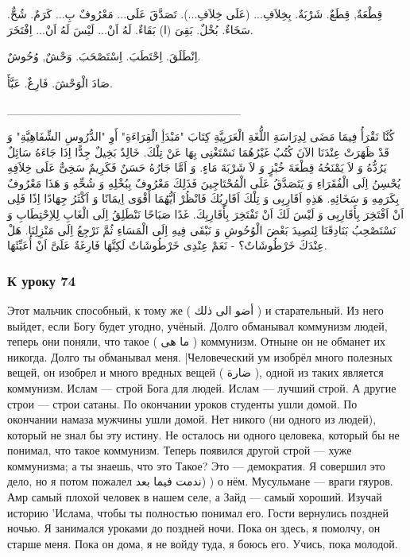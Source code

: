 \documentclass[a5paper]{article}
\begin{document}
قِطْعَةٌ, قِطَعٌ. شَرْبَةٌ. بِخِلاَفِ... (عَلَى خِلاَفِ...). تَصَدَّقَ عَلَى... مَعْرُوفٌ بِ... كَرَمٌ. شُحٌّ. سَخَاءٌ. بُخْلٌ. بَقِىَ (ا) بَقَاءٌ. لَهُ اَنْ... لَيْسَ لَهُ اَنْ... اِفْتَخَرَ.

اِنْطَلَقَ. اِحْتَطَبَ. اِسْتَصْحَبَ. وَحْشٌ, وُحُوشٌ. 

صَادَ الْوَحْشَ. فَارِغٌ. عَبَّأَ.

\_\_\_\_\_\_\_\_\_\_\_\_\_\_\_\_\_\_\_\_\_\_\_\_\_\_\_\_

كُنَّا نَقْرَأُ فِيمَا مَضَى لِدِرَاسَةِ اللُّغَةِ الْعَرَبِيَّةِ كِتَابَ "مَبْدَأِ الْقِرَاءَةِ" أَوِ "الدُّرُوسِ الشِّفَاهِيَّةِ" وَ قَدْ ظَهَرَتْ عِنْدَنَا الآنَ كُتُبٌ غَيْرُهُمَا نَسْتَغْنِى بِهَا عَنْ تِلْكَ. خَالِدٌ بَخِيلٌ جِدًّا اِذَا جَاءَهُ سَائِلٌ يَرُدُّهُ وَ لاَ يَمْنَحُهُ قِطْعَةَ خُبْزٍ وَ لاَ شَرْبَةَ مَاءٍ. وَ اَمَّا جَارُهُ حَسَنٌ فَكَرِيمٌ سَخِىٌّ عَلَى خِلاَفِهِ يُحْسِنُ اِلَى الْفُقَرَاءِ وَ يَتَصَدَّقُ عَلَى الْمُحْتَاجِينَ فَذَلِكَ مَعْرُوفٌ بِبُخْلِهِ وَ شُحِّهِ وَ هَذَا مَعْرُوفٌ بِكَرَمِهِ وَ سَخَائِهِ. هَذِهِ اَقَارِبِى وَ تِلْكَ اَقَارِبُكَ فَانْظُرْ اَيُّهُمَا أَقْوَى اِيمَانًا وَ اَكْثَرُ جِهَادًا اِذًا فَلِى اَنْ اَفْتَخِرَ بِأَقَارِبِى وَ لَيْسَ لَكَ اَنْ تَفْتَخِرَ بِأَقَارِبِكَ. غَدًا صَبَاحًا نَنْطَلِقُ اِلَى الْغَابِ لِلاِحْتِطَابِ وَ نَسْتَصْحِبُ بَنَادِقَنَا لِنَصِيدَ بَعْضَ الْوُحُوشِ وَ نَبْقَى فِيهِ اِلَى الْمَسَاءِ ثُمَّ نَرْجِعُ اِلَى مَنْزِلِنَا. هَلْ عِنْدَكَ خَرْطُوشَاتٌ؟ - نَعَمْ عِنْدِى خَرْطُوشَاتٌ لَكِنَّهَا فَارِغَةٌ عَلَىَّ اَنْ أُعَبِّئَهَا.

\subsubsection{К уроку 74}
Этот мальчик способный, к тому же ( أضو الى ذلك ) и старательный. Из него выйдет, если Богу будет угодно, учёный. Долго обманывал коммунизм людей, теперь они поняли, что такое ( ما هى ) коммунизм. Отныне он не обманет их никогда. Долго ты обманывал меня. |Человеческий ум изобрёл много полезных вещей, он изобрел и много вредных вещей ( ضارة ), одной из таких является коммунизм. Ислам — строй Бога для людей. Ислам — лучший строй. А другие строи — строи сатаны. По окончании уроков студенты ушли домой. По окончании намаза мужчины ушли домой. Нет никого (ни одного из людей), который не знал бы эту истину. Не осталось ни одного целовека, который бы не понимал, что такое коммунизм. Теперь появился другой строй — хуже коммунизма; а ты знаешь, что это Такое? Это — демократия. Я совершил это дело, но я потом пожалел ندمت فيما بعد) ) о нём. Мусульмане — враги гяуров. Амр самый плохой человек в нашем селе, а Зайд — самый хороший. Изучай историю 'Ислама, чтобы ты полностью понимал его. Гости вернулись поздней ночью. Я занимался уроками до поздней ночи. Пока он здесь, я помолчу, он старше меня. Пока он дома, я не войду туда, я боюсь его. Учись, пока молодой.
\end{document}
